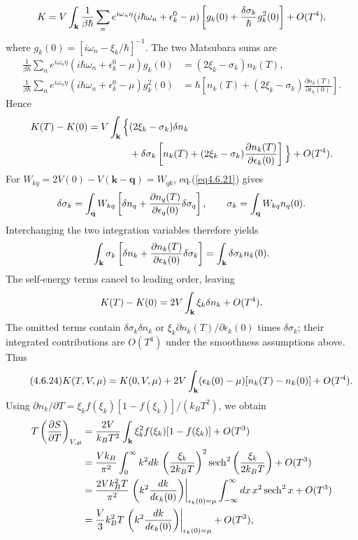 \begin{equation}\label{4.6.22}
K=V\int_{\bf k}\frac{1}{\beta\hbar}\sum_n e^{i\omega_n\eta}(i\hbar\omega_n+\epsilon_k^0-\mu)
\left[g_k(0)+\frac{\delta\sigma_k}{\hbar}g_k^2(0)\right]+O(T^4),
\end{equation}
where $g_k(0)=[i\omega_n-\xi_k/\hbar]^{-1}$.
The two Matsubara sums are
\[\begin{split}
\frac{1}{\beta\hbar}\sum_n e^{i\omega_n\eta}(i\hbar\omega_n+\epsilon_k^0-\mu)g_k(0)
&=(2\xi_k-\sigma_k)n_k(T),\\
\frac{1}{\beta\hbar}\sum_n e^{i\omega_n\eta}(i\hbar\omega_n+\epsilon_k^0-\mu)g_k^2(0)
&=\hbar\left[n_k(T)+(2\xi_k-\sigma_k)\frac{\partial n_k(T)}{\partial\epsilon_k(0)}\right].
\end{split}\]
Hence
\[\begin{split}
K(T)-K(0)=V\int_{\bf k}\Big\{&(2\xi_k-\sigma_k)\delta n_k\\
&+\delta\sigma_k\left[n_k(T)+(2\xi_k-\sigma_k)\frac{\partial n_k(T)}{\partial\epsilon_k(0)}\right]\Big\}+O(T^4).
\end{split}\]
For $W_{kq}=2V(0)-V(\mathbf k-\mathbf q)=W_{qk}$, eq.(\ref{eq4.6.21}) gives
\[\delta\sigma_k=\int_{\bf q}W_{kq}\left[\delta n_q+\frac{\partial n_q(T)}{\partial\epsilon_q(0)}\delta\sigma_q\right],\qquad
\sigma_k=\int_{\bf q}W_{kq}n_q(0).\]
Interchanging the two integration variables therefore yields
\[\int_{\bf k}\sigma_k\left[\delta n_k+\frac{\partial n_k(T)}{\partial\epsilon_k(0)}\delta\sigma_k\right]
=\int_{\bf k}\delta\sigma_k n_k(0).\]
The self-energy terms cancel to leading order, leaving
\begin{equation}\label{4.6.23}
K(T)-K(0)=2V\int_{\bf k}\xi_k\delta n_k+O(T^4).
\end{equation}
The omitted terms contain $\delta\sigma_k\delta n_k$ or
$\xi_k\partial n_k(T)/\partial\epsilon_k(0)$ times $\delta\sigma_k$; their integrated contributions are $O(T^4)$ under the smoothness assumptions above.
Thus
\begin{equation}\tag{4.6.24}
K(T,V,\mu)=K(0,V,\mu)+2V\int_{\bf k}(\epsilon_k(0)-\mu)[n_k(T)-n_k(0)]+O(T^4).
\end{equation}
Using $\partial n_k/\partial T=\xi_k f(\xi_k)[1-f(\xi_k)]/(k_BT^2)$, we obtain
\[\begin{split}
T\left(\frac{\partial S}{\partial T}\right)_{V,\mu}
&=\frac{2V}{k_BT^2}\int_{\bf k}\xi_k^2 f(\xi_k)[1-f(\xi_k)]+O(T^3)\\
&=\frac{Vk_B}{\pi^2}\int_0^\infty k^2dk\,
\left(\frac{\xi_k}{2k_BT}\right)^2\operatorname{sech}^2\left(\frac{\xi_k}{2k_BT}\right)+O(T^3)\\
&=\frac{2Vk_B^2T}{\pi^2}\left.\left(k^2\frac{dk}{d\epsilon_k(0)}\right)\right|_{\epsilon_k(0)=\mu}
\int_{-\infty}^\infty dx\,x^2\operatorname{sech}^2x+O(T^3)\\
&=\frac{V}{3}k_B^2T\left.\left(k^2\frac{dk}{d\epsilon_k(0)}\right)\right|_{\epsilon_k(0)=\mu}+O(T^3),
\end{split}\]
